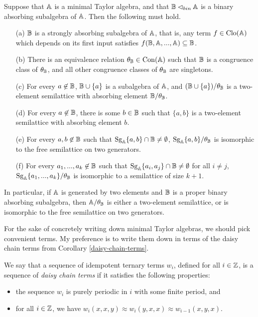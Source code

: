 \documentclass[letterpaper,11pt]{article}
\DeclareMathOperator{\Clo}{Clo}
\DeclareMathOperator{\Sg}{Sg}
\DeclareMathOperator{\Con}{Con}
\begin{document}
\begin{prop} Suppose that $\mathbb{A}$ is a minimal Taylor algebra, and that $\mathbb{B} \lhd_{bin} \mathbb{A}$ is a binary absorbing subalgebra of $\mathbb{A}$. Then the following must hold.
\begin{itemize}
\item[(a)] $\mathbb{B}$ is a strongly absorbing subalgebra of $\mathbb{A}$, that is, any term $f \in \Clo(\bA)$ which depends on its first input satisfies $f(\mathbb{B}, \mathbb{A}, ..., \mathbb{A}) \subseteq \mathbb{B}$.
\item[(b)] There is an equivalence relation $\theta_\bB \in \Con(\bA)$ such that $\mathbb{B}$ is a congruence class of $\theta_{\mathbb{B}}$, and all other congruence classes of $\theta_{\mathbb{B}}$ are singletons.
\item[(c)] For every $a \not\in \mathbb{B}$, $\mathbb{B} \cup \{a\}$ is a subalgebra of $\mathbb{A}$, and $(\mathbb{B} \cup \{a\})/\theta_{\mathbb{B}}$ is a two-element semilattice with absorbing element $\mathbb{B}/\theta_{\mathbb{B}}$.
\item[(d)] For every $a \not\in \mathbb{B}$, there is some $b \in \mathbb{B}$ such that $\{a,b\}$ is a two-element semilattice with absorbing element $b$.
\item[(e)] For every $a,b \not\in \mathbb{B}$ such that $\Sg_\bA\{a,b\} \cap \bB \ne \emptyset$, $\Sg_{\bA}\{a,b\}/\theta_\bB$ is isomorphic to the free semilattice on two generators.
\item[(f)] For every $a_1, ..., a_k \not\in \mathbb{B}$ such that $\Sg_\bA\{a_i,a_j\} \cap \bB \ne \emptyset$ for all $i \ne j$, $\Sg_{\bA}\{a_1, ..., a_k\}/\theta_\bB$ is isomorphic to a semilattice of size $k+1$.
\end{itemize}
In particular, if $\mathbb{A}$ is generated by two elements and $\mathbb{B}$ is a proper binary absorbing subalgebra, then $\mathbb{A}/\theta_{\mathbb{B}}$ is either a two-element semilattice, or is isomorphic to the free semilattice on two generators.
\end{prop}

For the sake of concretely writing down minimal Taylor algebras, we should pick convenient terms. My preference is to write them down in terms of the daisy chain terms from Corollary \ref{daisy-chain-terms}.

\begin{defn} We say that a sequence of idempotent ternary terms $w_i$, defined for all $i \in \mathbb{Z}$, is a sequence of \emph{daisy chain terms} if it satisfies the following properties:
\begin{itemize}
\item the sequence $w_i$ is purely periodic in $i$ with some finite period, and
\item for all $i \in \mathbb{Z}$, we have $w_i(x,x,y) \approx w_i(y,x,x) \approx w_{i-1}(x,y,x)$.
\end{itemize}
\end{defn}
\end{document}
